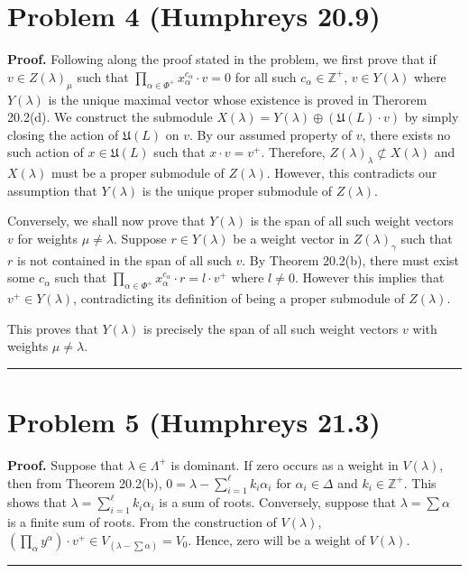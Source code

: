 \documentclass[12pt]{article}%
\newenvironment{proof}[1][Proof]{\textbf{#1.} }{\ \rule{0.5em}{0.5em}}
\begin{document}
\section*{Problem 4 (Humphreys 20.9)}
\begin{proof}
  Following along the proof stated in the problem, we first prove that if $v \in Z(\lambda)_{\mu}$ such that $\prod_{\alpha \in \Phi^+} x_{\alpha}^{c_{\alpha}}\cdot v = 0$ for all such $c_{\alpha} \in \mathbb{Z}^+$, $v \in Y(\lambda)$ where $Y(\lambda)$ is the unique maximal vector whose existence is proved in Therorem 20.2(d). We construct the submodule $X(\lambda) = Y(\lambda) \oplus (\mathfrak{U}(L)\cdot v)$ by simply closing the action of $\mathfrak{U}(L)$ on $v$. By our assumed property of $v$, there exists no such action of $x \in \mathfrak{U}(L)$ such that $x \cdot v = v^+$. Therefore, $Z(\lambda)_{\lambda} \not\subset X(\lambda)$ and $X(\lambda)$ must be a proper submodule of $Z(\lambda)$. However, this contradicts our assumption that $Y(\lambda)$ is the unique proper submodule of $Z(\lambda)$. \newline

  Conversely, we shall now prove that $Y(\lambda)$ is the span of all such weight vectors $v$ for weights $\mu \neq \lambda$. Suppose $r \in Y(\lambda)$ be a weight vector in $Z(\lambda)_{\gamma}$ such that $r$ is not contained in the span of all such $v$. By Theorem 20.2(b), there must exist some $c_{\alpha}$ such that $\prod_{\alpha \in \Phi^+} x_{\alpha}^{c_{\alpha}}\cdot r = l\cdot v^+$ where $l \neq 0$. However this implies that $v^+ \in Y(\lambda)$, contradicting its definition of being a proper submodule of $Z(\lambda)$. \newline

  This proves that $Y(\lambda)$ is precisely the span of all such weight vectors $v$ with weights $\mu \neq \lambda$.
\end{proof}

\section*{Problem 5 (Humphreys 21.3)}
\begin{proof}
  Suppose that $\lambda \in \Lambda^+$ is dominant. If zero occurs as a weight in $V(\lambda)$, then from Theorem 20.2(b), $0 = \lambda - \sum_{i=1}^{\ell}k_i\alpha_i$ for $\alpha_i \in \Delta$ and $k_i \in \mathbb{Z}^+$. This shows that $\lambda = \sum_{i=1}^{\ell}k_i \alpha_i$ is a sum of roots. Conversely, suppose that $\lambda = \sum \alpha$ is a finite sum of roots. From the construction of $V(\lambda)$, $(\prod_{\alpha}y^{\alpha}) \cdot v^+ \in V_{(\lambda - \sum  \alpha)} = V_0$. Hence, zero will be a weight of $V(\lambda)$.
\end{proof}
\end{document}
